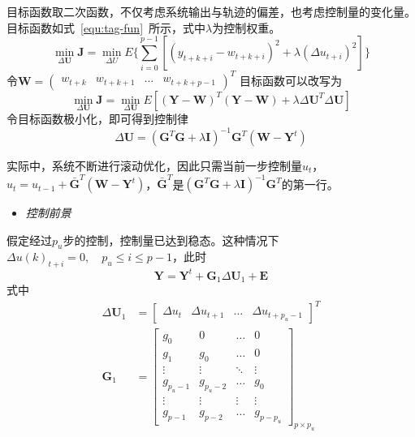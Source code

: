 目标函数取二次函数，不仅考虑系统输出与轨迹的偏差，也考虑控制量的变化量。目标函数如式~\ref{equ:tag-fun}~所示，式中$\lambda$为控制权重。
\begin{equation}
\label{equ:tag-fun}
\min_{\Delta{\bm{U}}}{\bm{J}} = \min_{\Delta{U}}E\{\sum_{i=0}^{p-1}{[(y_{t+k+i}-w_{t+k+i})^{2}+\lambda(\Delta{u_{t+i}})^{2}]}\}
\end{equation}
令$\bm{W} = {\begin{pmatrix} w_{t+k} & w_{t+k+1} &\ldots & w_{t+k+p-1} \end{pmatrix}}^{T}$
目标函数可以改写为
\begin{equation}
\min_{\Delta{\bm{U}}}{\bm{J}} = \min_{\Delta{\bm{U}}}E[(\bm{Y}-\bm{W})^{{T}}(\bm{Y}-\bm{W})+\lambda\Delta{\bm{U}}^{{T}}\Delta{\bm{U}}]
\end{equation}
令目标函数极小化，即可得到控制律
\begin{equation}
\Delta{\bm{U}} = (\bm{G}^{{T}}\bm{G}+\lambda{\bm{I}})^{-1}\bm{G}^{{T}}(\bm{W}-\bm{Y}^{t})
\end{equation}

实际中，系统不断进行滚动优化，因此只需当前一步控制量$u_t$，$u_{t}=u_{t-1}+\bar{\bm{G}}^{{T}}(\bm{W}-\bm{Y}^{t})$，$\bar{\bm{G}}^{{T}}$是$(\bm{G}^{{T}}\bm{G}+\lambda{\bm{I}})^{-1}\bm{G}^{{T}}$的第一行。

\begin{itemize}
\item{\emph{控制前景}}
\end{itemize}

假定经过$p_{u}$步的控制，控制量已达到稳态。这种情况下$\Delta{u}(k)_{t+i} = 0, \quad p_{u} \leq i \leq p-1$，此时
\begin{equation}
\bm{Y}=\bm{Y}^{t}+\bm{G}_{1}\Delta{\bm{U}}_{1}+\bm{E}
\end{equation}
式中
\begin{align*}
{\Delta}{\bm{U}_{1}} &= \left[\begin{array}{cccc} {\Delta}{u_{t}} & \Delta{u_{t+1}} & \ldots & \Delta{u_{t+p_{u}-1}} \end{array}\right]^{T} \\
\bm{G}_{1} &= \left[{\begin{array}{cccc}
g_{0} & 0 & \ldots & 0 \\
g_{1} & g_{0} & \ldots & 0\\
\vdots & \vdots & \ddots & \vdots\\
g_{p_{u}-1} & g_{p_{u}-2} &\ldots & g_{0}\\
\vdots & \vdots & \vdots & \vdots\\
g_{p-1} & g_{p-2} &\ldots & g_{p-p_{u}}
\end{array}}\right]_{{p}\times{p_{u}}}
\end{align*}

